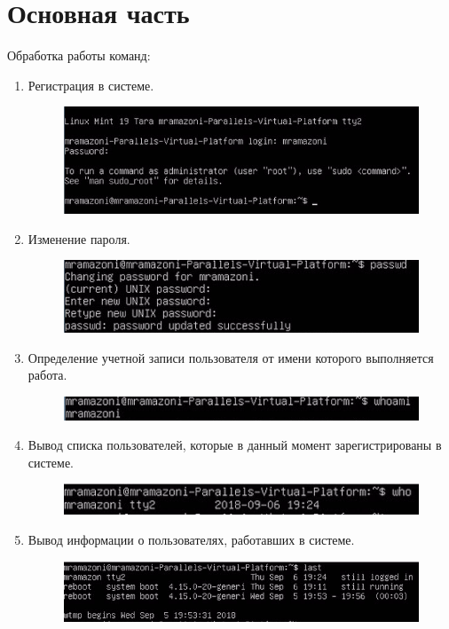 \section{Основная часть}
	Обработка работы команд:
\begin{enumerate}
	\item Регистрация в системе.
	\begin{figure}[h]
		\includegraphics{lab1_2.png}
		\centering
	\end{figure}
	\newpage
	\item Изменение пароля.
	\begin{figure}[h]
		\includegraphics{lab1_3.png}
		\centering
	\end{figure}
	\item Определение учетной записи пользователя от имени которого выполняется работа.
	\begin{figure}[h]
		\includegraphics{lab1_4.png}
		\centering
	\end{figure}
	\item Вывод списка пользователей, которые в данный момент зарегистрированы в системе.
	\begin{figure}[h]
		\includegraphics{lab1_5.png}
		\centering
	\end{figure}
	\item Вывод информации о пользователях, работавших в системе.
	\begin{figure}[h]
		\includegraphics{lab1_6.png}

\end{figure}
\end{enumerate}
